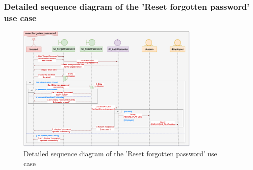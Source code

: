 \subsubsection{Detailed sequence diagram of the 'Reset forgotten password' use case}
\begin{figure}[h!]
    \centering
    \includegraphics[width=0.8\textwidth]{figures/det reset my forgoten password.png}
    \caption{Detailed sequence diagram of the 'Reset forgotten password' use case}
\end{figure}
\clearpage

